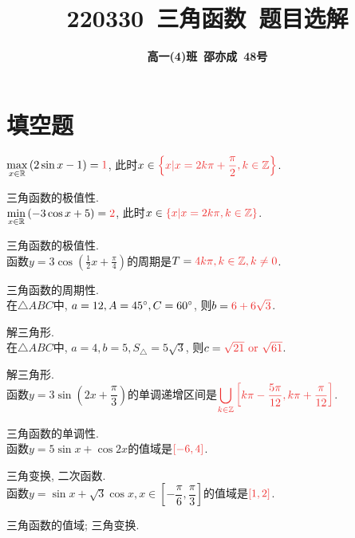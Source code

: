 \documentclass[8pt]{article}
\author{\normalfont\sffamily\large\bfseries{高一(4)班\ 邵亦成\ 48号}}
\title{\normalfont\sffamily\huge\bfseries{\textcolor{allanblue}{220330}\ \textcolor{allancyan}{三角函数}\ 题目选解}}
\date{}
\begin{document}
	\maketitle

	\section{填空题}
		$\displaystyle \max_{x\in\RR}{\left(2\sin x-1\right)}=\ansmath{1}$, 此时$x\in\ansmath{\left\{x|x=2k\pi+\dfrac{\pi}{2}, k\in\ZZ\right\}}$.

		三角函数的极值性.
		~\\

		$\displaystyle \min_{x\in\RR}{\left(-3\cos x+5\right)}=\ansmath{2}$, 此时$x\in\ansmath{\left\{x|x=2k\pi, k\in\ZZ\right\}}$.

		三角函数的极值性.
		~\\

		函数$\displaystyle y=3\cos\left(\frac{1}{2}x+\frac{\pi}{4}\right)$的周期是$T=\ansmath{4k\pi, k\in\ZZ, k\neq 0}$.

		三角函数的周期性.
		~\\

		在$\triangle ABC$中, $a=12, A=45^\circ, C=60^\circ$, 则$b=\ansmath{6+6\sqrt{3}}$.

		解三角形.
		~\\

		在$\triangle ABC$中, $a=4, b=5, S_{\triangle}=5\sqrt{3}$, 则$c=\ansmath{\sqrt{21} \lgor \sqrt{61}}$.

		解三角形.
		~\\

		函数$y=3\sin\left(2x+\dfrac{\pi}{3}\right)$的单调递增区间是$\displaystyle\ansmath{\bigcup_{k\in\ZZ}{\left[k\pi-\frac{5\pi}{12}, k\pi+\frac{\pi}{12}\right]}}$.

		三角函数的单调性.
		~\\

		函数$y=5\sin x+\cos 2x$的值域是$\ansmath{[-6, 4]}$.

		三角变换, 二次函数.
		~\\

		函数$y=\sin x +\sqrt{3} \cos x, x\in\left[-\dfrac{\pi}{6}, \dfrac{\pi}{3}\right]$的值域是$\ansmath{[1, 2]}$.

		三角函数的值域; 三角变换.
		~\\
\end{document}
